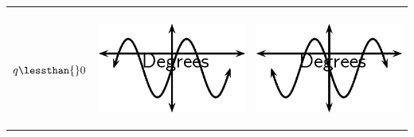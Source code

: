 \begin{center}
\begin{xtabular*}{\mytablewidth}[t]{|p{10\mystarwidth}|p{10\mystarwidth}|p{10\mystarwidth}|}
\begin{center}
\vspace{2pt}
\vspace{.1in}
\end{center}    
\tabularnewline{}
    $q\lessthan{}0$
    &
\setcounter{subfigure}{0}
\label{m39414*id85421}
\begin{center}
\label{m39414*id85421!!!underscore!!!media}\label{m39414*id85421!!!underscore!!!printimage}\includegraphics{col11306.imgs/m39414_MG10C15_021.png} %
\vspace{2pt}
\vspace{.1in}
\end{center}    
    &
\setcounter{subfigure}{0}
\label{m39414*id85433}
\begin{center}
\label{m39414*id85433!!!underscore!!!media}\label{m39414*id85433!!!underscore!!!printimage}\includegraphics{col11306.imgs/m39414_MG10C15_022.png} %
\vspace{2pt}
\vspace{.1in}
\end{center}    
\tabularnewline{}
\end{xtabular*}
\end{center}
